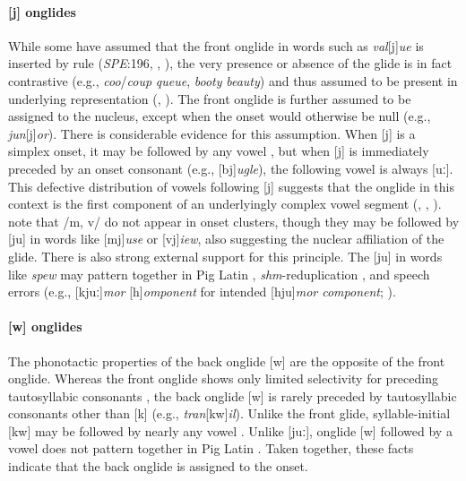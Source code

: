 \paragraph{[j] onglides} While some have assumed that the front onglide in words such as \emph{val}[j]\emph{ue} is inserted by rule (\emph{SPE}:196, \citealt[][89]{Halle1985a}, \citealt[][217]{McMahon1990}), the very presence or absence of the glide is in fact contrastive (e.g., \emph{coo}/\emph{coup} \alt{} \emph{queue}, \emph{booty} \alt{} \emph{beauty}) and thus assumed to be present in underlying representation (\citealt{Anderson1988b}, \citealt[278]{Borowsky1986}). The front onglide is further assumed to be assigned to the nucleus, except when the onset would otherwise be null (e.g., \emph{jun}[j]\emph{or}). There is considerable evidence for this assumption. When [j] is a simplex onset, it may be followed by any vowel \citep[][276]{Borowsky1986}, but when [j] is immediately preceded by an onset consonant (e.g., [bj]\emph{ugle}), the following vowel is always [uː]. This defective distribution of vowels following [j] suggests that the onglide in this context is the first component of an underlyingly complex vowel segment (\citealp[][232]{Hayes1980}, \citealp[][61f.]{Harris1994}, \citealp{Davis1995}). \citet[][42]{Clements1983} note that /m, v/ do not appear in onset clusters, though they may be followed by [ju] in words like [mj]\emph{use} or [vj]\emph{iew}, also suggesting the nuclear affiliation of the glide. There is also strong external support for this principle. The [ju] in words like \emph{spew} may pattern together in Pig Latin \citep{Davis1995,Idsardi2005}, \emph{shm}-reduplication \citep{Nevins2003}, and speech errors (e.g., [kjuː]\emph{mor} [h]\emph{omponent} for intended [hju]\emph{mor component}; \citealt[130]{Shattuck-Hufnagel1986}).

\paragraph{[w] onglides} The phonotactic properties of the back onglide [w] are the opposite of the front onglide. Whereas the front onglide shows only limited selectivity for preceding tautosyllabic consonants \citep{Davis1995,Kaye1996}, the back onglide [w] is rarely preceded by tautosyllabic consonants other than [k] (e.g., \emph{tran}[kw]\emph{il}). Unlike the front glide, syllable-initial [kw] may be followed by nearly any vowel \citep[161]{Davis1995}. Unlike [juː], onglide [w] followed by a vowel does not pattern together in Pig Latin \citep[166]{Davis1995}. Taken together, these facts indicate that the back onglide is assigned to the onset.

